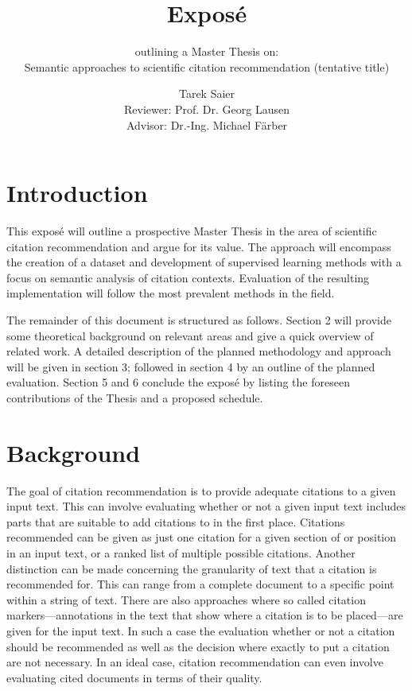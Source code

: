 \documentclass{proseminar}
\begin{document}

\title{Expos\'e}
\subtitle{outlining a Master Thesis on:\\Semantic approaches to scientific citation recommendation (tentative title)}

\author{Tarek Saier\\Reviewer: Prof. Dr. Georg Lausen\\Advisor: Dr.-Ing. Michael Färber}

\maketitle

\section{Introduction}
This expos\'e will outline a prospective Master Thesis in the area of scientific citation recommendation and argue for its value. The approach will encompass the creation of a dataset and development of supervised learning methods with a focus on semantic analysis of citation contexts. Evaluation of the resulting implementation will follow the most prevalent methods in the field.

The remainder of this document is structured as follows. Section 2 will provide some theoretical background on relevant areas and give a quick overview of related work. A detailed description of the planned methodology and approach will be given in section 3; followed in section 4 by an outline of the planned evaluation. Section 5 and 6 conclude the expos\'e by listing the foreseen contributions of the Thesis and a proposed schedule.

\section{Background}
The goal of citation recommendation is to provide adequate citations to a given input text. This can involve evaluating whether or not a given input text includes parts that are suitable to add citations to in the first place. Citations recommended can be given as just one citation for a given section of or position in an input text, or a ranked list of multiple possible citations. Another distinction can be made concerning the granularity of text that a citation is recommended for. This can range from a complete document to a specific point within a string of text. There are also approaches where so called citation markers---annotations in the text that show where a citation is to be placed---are given for the input text. In such a case the evaluation whether or not a citation should be recommended as well as the decision where exactly to put a citation are not necessary. In an ideal case, citation recommendation can even involve evaluating cited documents in terms of their quality.
\end{document}
